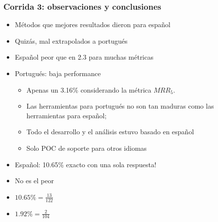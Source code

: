 \begin{frame}
\frametitle{Corrida 3: observaciones y conclusiones}

\begin{itemize}
  \item Métodos que mejores resultados dieron para español
  \item Quizás, mal extrapolados a portugués
  \item Español peor que en 2.3 para muchas métricas
  \item Portugués: baja performance
  \begin{itemize}
    \item Apenas un 3.16\% considerando la métrica $MRR_5$. 
    \item Las herramientas para portugués no son tan maduras como las herramientas para español; 
    \item Todo el desarrollo y el análisis estuvo basado en español
    \item Solo POC de soporte para otros idiomas
  \end{itemize}
  \item Español: 10.65\% exacto con una sola respuesta! 
  \item No es el peor
\end{itemize}
\begin{itemize}
  \item $10.65\% = \frac{13}{122}$
  \item $1.92\% = \frac{2}{104}$
\end{itemize}
\end{frame}




